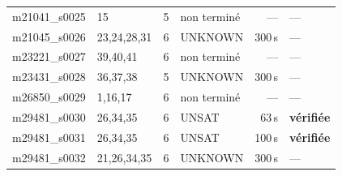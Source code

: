 \begin{longtable}{llrlrl}
m21041\_s0025 & 15 & 5 & non termin\'e & --- & ---\\
m21045\_s0026 & 23,24,28,31 & 6 & UNKNOWN & 300\,s & ---\\
m23221\_s0027 & 39,40,41 & 6 & non termin\'e & --- & ---\\
m23431\_s0028 & 36,37,38 & 5 & UNKNOWN & 300\,s & ---\\
m26850\_s0029 & 1,16,17 & 6 & non termin\'e & --- & ---\\
m29481\_s0030 & 26,34,35 & 6 & UNSAT & 63\,s & \textbf{v\'erifi\'ee}\\
m29481\_s0031 & 26,34,35 & 6 & UNSAT & 100\,s & \textbf{v\'erifi\'ee}\\
m29481\_s0032 & 21,26,34,35 & 6 & UNKNOWN & 300\,s & ---\\
\bottomrule\end{longtable}
